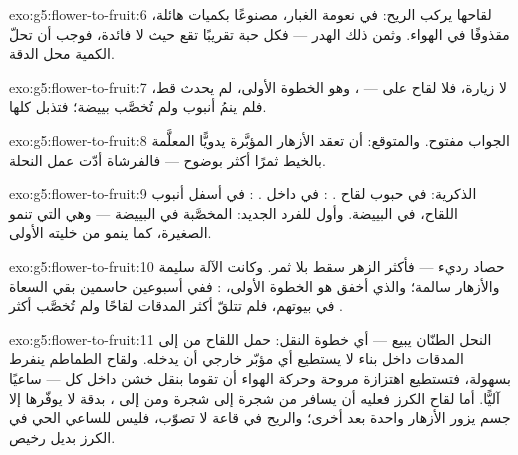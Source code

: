 \begin{solution}{exo:g5:flower-to-fruit:6}
لقاحها يركب الريح: في نعومة الغبار، مصنوعًا بكميات هائلة، مقذوفًا
في الهواء. وثمن ذلك الهدر --- فكل حبة تقريبًا تقع حيث لا فائدة،
فوجب أن تحلّ الكمية محل الدقة.
\end{solution}

\begin{solution}{exo:g5:flower-to-fruit:7}
لا زيارة، فلا لقاح على  --- ، وهو الخطوة الأولى، لم
يحدث قط، فلم ينمُ أنبوب ولم تُخصَّب بييضة؛ فتذبل  كلها.
\end{solution}

\begin{solution}{exo:g5:flower-to-fruit:8}
الجواب مفتوح. والمتوقع: أن تعقد الأزهار المؤبَّرة يدويًّا المعلَّمة
بالخيط ثمرًا أكثر بوضوح --- فالفرشاة أدّت عمل النحلة.
\end{solution}

\begin{solution}{exo:g5:flower-to-fruit:9}
 الذكرية: في حبوب لقاح . : في 
داخل . : في أسفل أنبوب اللقاح، في البييضة. وأول 
للفرد الجديد:  المخصَّبة في البييضة --- وهي التي تنمو 
 الصغيرة، كما ينمو  من خليته الأولى.
\end{solution}

\begin{solution}{exo:g5:flower-to-fruit:10}
حصاد رديء --- فأكثر الزهر سقط بلا ثمر. وكانت الآلة سليمة والأزهار
سالمة؛ والذي أخفق هو الخطوة الأولى، : ففي أسبوعين حاسمين
بقي السعاة في بيوتهم، فلم تتلقّ أكثر المدقات لقاحًا ولم تُخصَّب أكثر
.
\end{solution}

\begin{solution}{exo:g5:flower-to-fruit:11}
النحل الطنّان يبيع  --- أي خطوة النقل: حمل اللقاح من
 إلى المدقات داخل بناء لا يستطيع أي مؤبّر خارجي أن يدخله.
ولقاح الطماطم ينفرط بسهولة، فتستطيع اهتزازة مروحة وحركة الهواء أن
تقوما بنقل خشن داخل كل  --- ساعيًا آليًّا. أما لقاح الكرز فعليه
أن يسافر من شجرة إلى شجرة ومن  إلى ، بدقة لا يوفّرها إلا
جسم يزور الأزهار واحدة بعد أخرى؛ والريح في قاعة لا تصوّب، فليس
للساعي الحي في الكرز بديل رخيص.
\end{solution}
